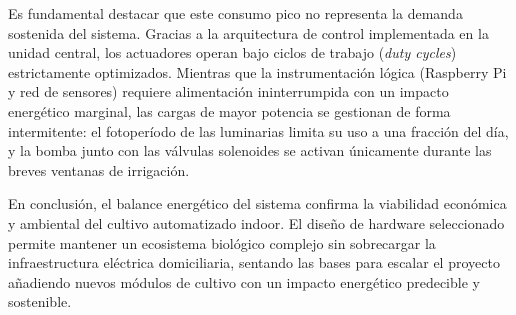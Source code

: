 Es fundamental destacar que este consumo pico no representa la demanda sostenida del sistema. Gracias a la arquitectura de control implementada en la unidad central, los actuadores operan bajo ciclos de trabajo (\textit{duty cycles}) estrictamente optimizados. Mientras que la instrumentación lógica (Raspberry Pi y red de sensores) requiere alimentación ininterrumpida con un impacto energético marginal, las cargas de mayor potencia se gestionan de forma intermitente: el fotoperíodo de las luminarias limita su uso a una fracción del día, y la bomba junto con las válvulas solenoides se activan únicamente durante las breves ventanas de irrigación.

En conclusión, el balance energético del sistema confirma la viabilidad económica y ambiental del cultivo automatizado indoor. El diseño de hardware seleccionado permite mantener un ecosistema biológico complejo sin sobrecargar la infraestructura eléctrica domiciliaria, sentando las bases para escalar el proyecto añadiendo nuevos módulos de cultivo con un impacto energético predecible y sostenible.
